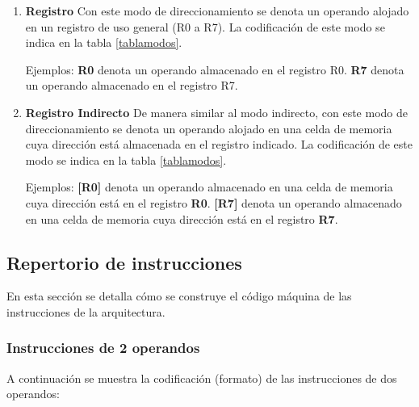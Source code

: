 \begin{enumerate}
\item \textbf{Registro} Con este modo de direccionamiento se denota un operando alojado en un registro de uso general (R0 a R7). La codificación de este modo se indica en la tabla \ref{tablamodos}.

Ejemplos:
\textbf{R0} denota un operando almacenado en el registro R0. 
\textbf{R7} denota un operando almacenado en el registro R7.

\item \textbf{Registro Indirecto} De manera similar al modo indirecto, con este modo de direccionamiento se denota un operando alojado en una celda de memoria cuya dirección está almacenada en el registro indicado. La codificación de este modo se indica en la tabla \ref{tablamodos}.


Ejemplos:
\textbf{[R0]} denota un operando almacenado en una celda de memoria cuya dirección está en el registro \textbf{R0}.
\textbf{[R7]} denota un operando almacenado en una celda de memoria cuya dirección está en el registro \textbf{R7}.

\end{enumerate}


\subsection{Repertorio de instrucciones}
En esta sección se detalla cómo se construye el código máquina de las instrucciones de la arquitectura.
\subsubsection{Instrucciones de 2 operandos}

A continuación se muestra la codificación (formato) de las instrucciones de dos operandos:

